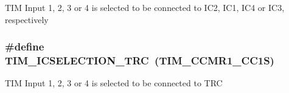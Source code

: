 T\-I\-M Input 1, 2, 3 or 4 is selected to be connected to I\-C2, I\-C1, I\-C4 or I\-C3, respectively \hypertarget{group___t_i_m___input___capture___selection_ga9e0191bbf1a82dd9150b9283c39276e7}{
\subsubsection[{T\-I\-M\-\_\-\-I\-C\-S\-E\-L\-E\-C\-T\-I\-O\-N\-\_\-\-T\-R\-C}]{\setlength{\rightskip}{0pt plus 5cm}\#define T\-I\-M\-\_\-\-I\-C\-S\-E\-L\-E\-C\-T\-I\-O\-N\-\_\-\-T\-R\-C~({\bf T\-I\-M\-\_\-\-C\-C\-M\-R1\-\_\-\-C\-C1\-S})}}\label{group___t_i_m___input___capture___selection_ga9e0191bbf1a82dd9150b9283c39276e7}
T\-I\-M Input 1, 2, 3 or 4 is selected to be connected to T\-R\-C 